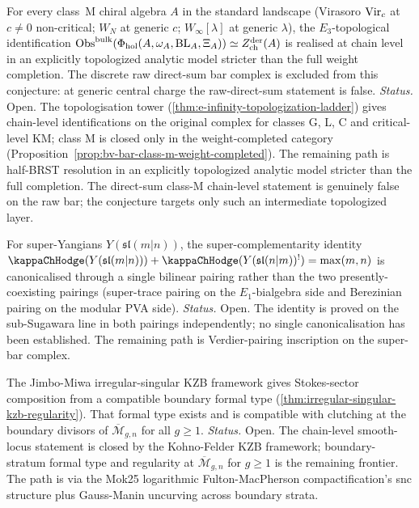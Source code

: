 \begin{conjecture}
\ClaimStatusConjectured
For every class~M chiral algebra $A$ in the standard landscape
(Virasoro $\mathrm{Vir}_{c}$ at $c \neq 0$ non-critical; $W_{N}$ at generic
$c$; $W_{\infty}[\lambda]$ at generic $\lambda$), the
	$E_{3}$-topological identification
	$\mathrm{Obs}^{\mathrm{bulk}}(\Phi_{\mathrm{hol}}(A,\omega_A,\mathrm{BL}_A,\Xi_A))
	\simeq Z^{\mathrm{der}}_{\mathrm{ch}}(A)$ is realised at chain
level in an explicitly topologized analytic model stricter than the
full weight completion. The discrete raw direct-sum bar complex is
excluded from this conjecture: at generic central charge the
raw-direct-sum statement is false.
\emph{Status.} Open. The topologisation tower
(\cref{thm:e-infinity-topologization-ladder}) gives chain-level
identifications on the original complex for classes G, L, C and
critical-level KM; class M is closed only in the weight-completed
category (Proposition~\ref*{prop:bv-bar-class-m-weight-completed}).
The remaining path is half-BRST resolution in an explicitly
topologized analytic model stricter than the full completion. The
direct-sum class-M chain-level statement is genuinely false on the
raw bar; the conjecture targets only such an intermediate
topologized layer.
\end{conjecture}

\begin{conjecture}[\label{conj:f4-super-complementarity-canonical}F4:
canonical pairing for super-complementarity
$\kappaChHodge+\kappaChHodge^{!} = \max(m, n)$]
\ClaimStatusConjectured
For super-Yangians $Y(\mathfrak{sl}(m | n))$, the
super-complementarity identity
$\kappaChHodge(Y(\mathfrak{sl}(m | n))) +
\kappaChHodge(Y(\mathfrak{sl}(n | m))^{!}) = \max(m, n)$
is canonicalised through a single bilinear pairing rather than the
two presently-coexisting pairings (super-trace pairing on the
$E_{1}$-bialgebra side and Berezinian pairing on the modular PVA
side).
\emph{Status.} Open. The identity is proved on the sub-Sugawara
line in both pairings independently; no single canonicalisation has
been established. The remaining path is
Verdier-pairing inscription on the super-bar complex.
\end{conjecture}

\begin{conjecture}
\ClaimStatusConjectured
The Jimbo-Miwa irregular-singular KZB framework gives
Stokes-sector composition from a compatible boundary formal type
(\cref{thm:irregular-singular-kzb-regularity}). That formal type
exists and is compatible with clutching at the boundary divisors of
$\overline{\mathcal{M}}_{g, n}$ for all $g \ge 1$.
\emph{Status.} Open. The chain-level smooth-locus statement is
closed by the Kohno-Felder KZB framework; boundary-stratum formal
type and regularity at $\overline{\mathcal{M}}_{g, n}$ for
$g \ge 1$ is the remaining frontier. The path is via the Mok25 logarithmic
Fulton-MacPherson compactification's snc structure plus
Gauss-Manin uncurving across boundary strata.
\end{conjecture}


